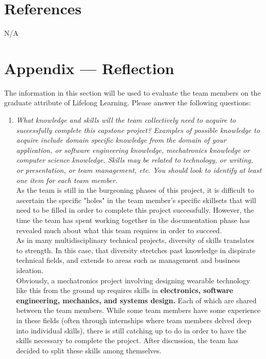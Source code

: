 \documentclass[12pt]{article}
\begin{document}
\section{References}
\label{References}
N/A

\section*{Appendix --- Reflection}

The information in this section will be used to evaluate the team members on the
graduate attribute of Lifelong Learning.  Please answer the following questions:

\begin{enumerate}
  \item \textit{What knowledge and skills will the team collectively need to acquire to
        successfully complete this capstone project?  Examples of possible knowledge
        to acquire include domain specific knowledge from the domain of your
        application, or software engineering knowledge, mechatronics knowledge or
        computer science knowledge.  Skills may be related to technology, or writing,
        or presentation, or team management, etc.  You should look to identify at
        least one item for each team member.}\\

	As the team is still in the burgeoning phases of this project, it is difficult to ascertain the specific "holes" in the team member's specific skillsets that will need to be filled in order to complete this project successfully. However, the time the team has spent working together in the documentation phase has revealed much about what this team requires in order to succeed. \\

As in many multidisciplinary technical projects, diversity of skills translates to strength. In this case, that diversity stretches past knowledge in dispirate technical fields, and extends to areas such as management and business ideation.\\

Obviously, a mechatronics project involving designing wearable technology like this from the ground up requires skills in \textbf{electronics, software engineering, mechanics, and systems design.} Each of which are shared between the team members. While some team members have some experience in these fields (often through internships where team members delved deep into individual skills), there is still catching up to do in order to have the skills necessary to complete the project. After discussion, the team has decided to split these skills among themselves.\\


\end{enumerate}
\end{document}
